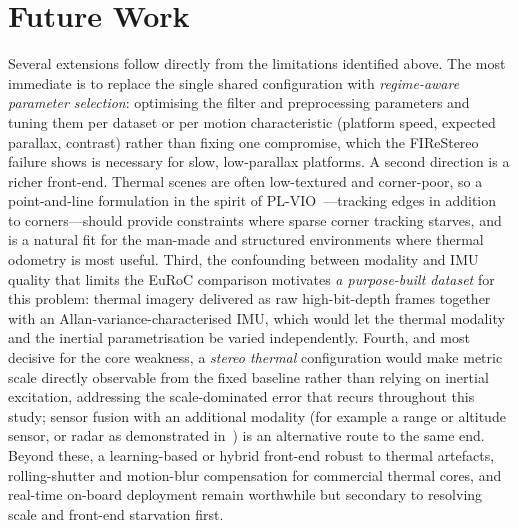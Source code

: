\section{Future Work}
\label{sec:c_future}
Several extensions follow directly from the limitations identified above. The most immediate is to replace the single shared configuration with \emph{regime-aware parameter selection}: optimising the filter and preprocessing parameters and tuning them per dataset or per motion characteristic (platform speed, expected parallax, contrast) rather than fixing one compromise, which the FIReStereo failure shows is necessary for slow, low-parallax platforms. A second direction is a richer front-end. Thermal scenes are often low-textured and corner-poor, so a point-and-line formulation in the spirit of PL-VIO~\cite{He_2018}---tracking edges in addition to corners---should provide constraints where sparse corner tracking starves, and is a natural fit for the man-made and structured environments where thermal odometry is most useful. Third, the confounding between modality and IMU quality that limits the EuRoC comparison motivates \emph{a purpose-built dataset} for this problem: thermal imagery delivered as raw high-bit-depth frames together with an Allan-variance-characterised IMU, which would let the thermal modality and the inertial parametrisation be varied independently. Fourth, and most decisive for the core weakness, a \emph{stereo thermal} configuration would make metric scale directly observable from the fixed baseline rather than relying on inertial excitation, addressing the scale-dominated error that recurs throughout this study; sensor fusion with an additional modality (for example a range or altitude sensor, or radar as demonstrated in~\cite{Doer_2021}) is an alternative route to the same end. Beyond these, a learning-based or hybrid front-end robust to thermal artefacts, rolling-shutter and motion-blur compensation for commercial thermal cores, and real-time on-board deployment remain worthwhile but secondary to resolving scale and front-end starvation first.